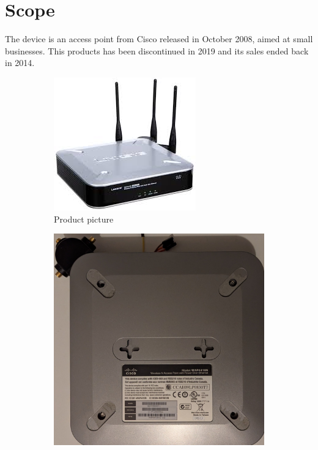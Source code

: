 \documentclass{article}
\begin{document}
\section{Scope}
The device is an access point from Cisco released in October 2008, aimed at small businesses. This products has been discontinued in 2019 and its sales ended back in 2014.
\begin{figure}[!h]
	\centering
	\begin{subfigure}{0.3\textwidth}
		\includegraphics[width=\textwidth]{AP.jpg}
		\caption{Product picture}
		\label{outside}
	\end{subfigure}
	\begin{subfigure}{0.3\textwidth}
		\includegraphics[width=\textwidth]{bottom.jpg}

\end{subfigure}
\end{figure}
\end{document}

